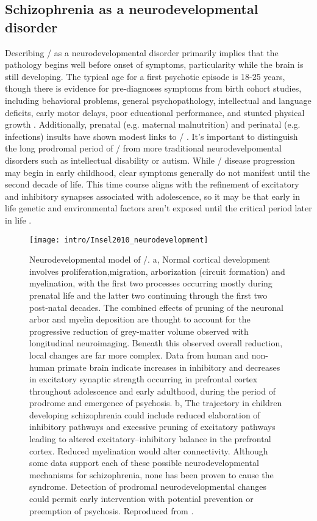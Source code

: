 \subsection{Schizophrenia as a neurodevelopmental disorder}
\label{sec:intro:scz:neurodevelopment}
Describing \scz/ as a neurodevelopmental disorder primarily implies that the pathology begins well before onset of symptoms, particularity while the brain is still developing.
The typical age for a first psychotic episode is 18-25 years, though there is evidence for pre-diagnoses symptoms from birth cohort studies, including behavioral problems, general psychopathology, intellectual and language deficits, early motor delays, poor educational performance, and stunted physical growth \citep{Welham2009}.
Additionally, prenatal (e.g. maternal malnutrition) and perinatal (e.g. infections) insults have shown modest links to \scz/ \citep{Lewis2002}.
It's important to distinguish the long prodromal period of \scz/ from more traditional neurodevelpomental disorders such as intellectual disability or autism.
While \scz/ disease progression may begin in early childhood, clear symptoms generally do not manifest until the second decade of life.
This time course aligns with the refinement of excitatory and inhibitory synapses associated with adolescence, so it may be that early in life genetic and environmental factors aren't exposed until the critical period later in life \citep[\autoref{fig:intro:scz:neurodevelopmental},][]{Insel2010a}.

\begin{figure}
	\centering
	\texttt{[image: intro/Insel2010\_neurodevelopment]}
	\caption[Neurodevelopmental model of \scz/]{Neurodevelopmental model of \scz/.
	a, Normal cortical development involves proliferation,migration, arborization (circuit formation) and myelination, with the first two processes occurring mostly during prenatal life and the latter two continuing through the first two post-natal decades. The combined effects of pruning of the neuronal arbor and myelin deposition are thought to account for the progressive reduction of grey-matter volume observed with longitudinal neuroimaging. Beneath this observed overall reduction, local changes are far more complex. Data from human and non-human primate brain indicate increases in inhibitory and decreases in excitatory synaptic strength occurring in prefrontal cortex throughout adolescence and early adulthood, during the period of prodrome and emergence of psychosis.
	b, The trajectory in children developing schizophrenia could include reduced elaboration of inhibitory pathways and excessive pruning of excitatory pathways leading to altered excitatory–inhibitory balance in the prefrontal cortex. Reduced myelination would alter connectivity. Although some data support each of these possible neurodevelopmental mechanisms for schizophrenia, none has been proven to cause the syndrome. Detection of prodromal neurodevelopmental changes could permit early intervention with potential prevention or preemption of psychosis.
	Reproduced from \citet{Insel2010a}.}
	\label{fig:intro:scz:neurodevelopmental}
\end{figure}

